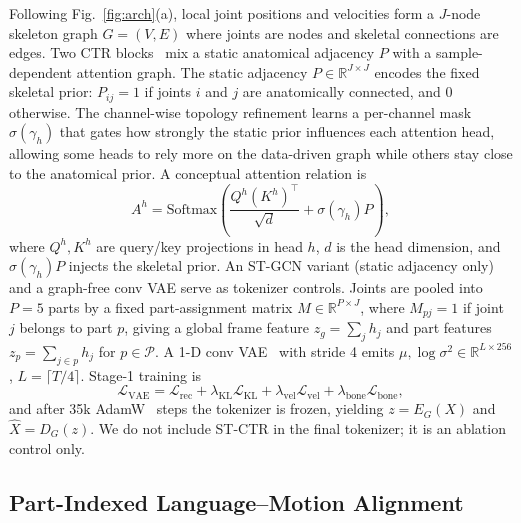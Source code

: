 \documentclass[journal]{IEEEtran}
\begin{document}
Following Fig.~\ref{fig:arch}(a), local joint positions and velocities form a $J$-node skeleton graph $G=(V,E)$ where joints are nodes and skeletal connections are edges. Two CTR blocks~\cite{chen2021ctrgcn} mix a static anatomical adjacency $P$ with a sample-dependent attention graph. The static adjacency $P\in\mathbb{R}^{J\times J}$ encodes the fixed skeletal prior: $P_{ij}=1$ if joints $i$ and $j$ are anatomically connected, and $0$ otherwise. The channel-wise topology refinement learns a per-channel mask $\sigma(\gamma_h)$ that gates how strongly the static prior influences each attention head, allowing some heads to rely more on the data-driven graph while others stay close to the anatomical prior. A conceptual attention relation is
\begin{equation}
A^{h}=\mathrm{Softmax}\!\left(\frac{Q^{h}(K^{h})^{\top}}{\sqrt{d}}+\sigma(\gamma_h)P\right),
\end{equation}
where $Q^{h},K^{h}$ are query/key projections in head $h$, $d$ is the head dimension, and $\sigma(\gamma_h)P$ injects the skeletal prior. An ST-GCN variant (static adjacency only) and a graph-free conv VAE serve as tokenizer controls. Joints are pooled into $P{=}5$ parts by a fixed part-assignment matrix $M\in\mathbb{R}^{P\times J}$, where $M_{pj}=1$ if joint $j$ belongs to part $p$, giving a global frame feature $z_g=\sum_j h_j$ and part features $z_p=\sum_{j\in p} h_j$ for $p\in\mathcal{P}$. A 1-D conv VAE~\cite{kingma2014vae} with stride 4 emits $\mu,\log\sigma^2\in\mathbb{R}^{L\times 256}$, $L=\lceil T/4\rceil$. Stage-1 training is
\begin{equation}
\mathcal{L}_{\mathrm{VAE}}=\mathcal{L}_{\mathrm{rec}}+\lambda_{\mathrm{KL}}\mathcal{L}_{\mathrm{KL}}+\lambda_{\mathrm{vel}}\mathcal{L}_{\mathrm{vel}}+\lambda_{\mathrm{bone}}\mathcal{L}_{\mathrm{bone}},
\end{equation}
and after 35k AdamW~\cite{loshchilov2019adamw} steps the tokenizer is frozen, yielding $z=E_G(X)$ and $\hat X=D_G(z)$. We do not include ST-CTR in the final tokenizer; it is an ablation control only.

\subsection{Part-Indexed Language--Motion Alignment}
\label{sec:method-align}
\end{document}
